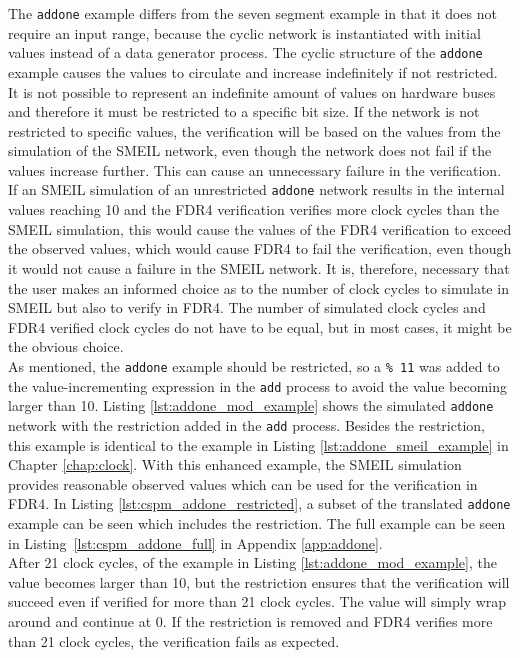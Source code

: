 The \texttt{addone} example differs from the seven segment example in that it does not require an input range, because the cyclic network is instantiated with initial values instead of a data generator process. The cyclic structure of the \texttt{addone} example causes the values to circulate and increase indefinitely if not restricted. It is not possible to represent an indefinite amount of values on hardware buses and therefore it must be restricted to a specific bit size. If the network is not restricted to specific values, the verification will be based on the values from the simulation of the SMEIL network, even though the network does not fail if the values increase further.  This can cause an unnecessary failure in the verification.
If an SMEIL simulation of an unrestricted \texttt{addone} network results in the internal values reaching 10 and the FDR4 verification verifies more clock cycles than the SMEIL simulation, this would cause the values of the FDR4 verification to exceed the observed values, which would cause FDR4 to fail the verification, even though it would not cause a failure in the SMEIL network. It is, therefore, necessary that the user makes an informed choice as to the number of clock cycles to simulate in SMEIL but also to verify in FDR4. The number of simulated clock cycles and FDR4 verified clock cycles do not have to be equal, but in most cases, it might be the obvious choice. \\

As mentioned, the \texttt{addone} example should be restricted, so a \texttt{\% 11} was added to the value-incrementing expression in the \texttt{add} process to avoid the value becoming larger than 10. Listing \ref{lst:addone_mod_example} shows the simulated \texttt{addone} network with the restriction added in the \texttt{add} process. Besides the restriction, this example is identical to the example in Listing \ref{lst:addone_smeil_example} in Chapter \ref{chap:clock}.
With this enhanced example, the SMEIL simulation provides reasonable observed values which can be used for the verification in FDR4. In Listing \ref{lst:cspm_addone_restricted}, a subset of the translated \texttt{addone} example can be seen which includes the restriction. The full \cspm{} example can be seen in Listing~\ref{lst:cspm_addone_full} in Appendix \ref{app:addone}.\\

After 21 clock cycles, of the example in Listing \ref{lst:addone_mod_example}, the value becomes larger than 10, but the restriction ensures that the verification will succeed even if verified for more than 21 clock cycles. The value will simply wrap around and continue at 0. If the restriction is removed and FDR4 verifies more than 21 clock cycles, the verification fails as expected. \\

